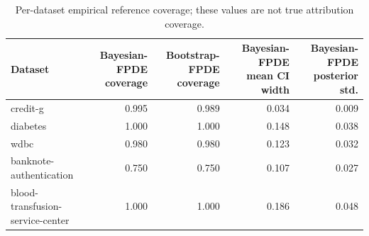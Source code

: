 \begin{table}[t]
\centering
\caption{Per-dataset empirical reference coverage; these values are not true attribution coverage.}
\label{tab:per_dataset_coverage}
\begin{tabular}{l r r r r}
        \hline
        Dataset & Bayesian-FPDE coverage & Bootstrap-FPDE coverage & Bayesian-FPDE mean CI width & Bayesian-FPDE posterior std. \\
        \hline
        credit-g & 0.995 & 0.989 & 0.034 & 0.009 \\
        diabetes & 1.000 & 1.000 & 0.148 & 0.038 \\
        wdbc & 0.980 & 0.980 & 0.123 & 0.032 \\
        banknote-authentication & 0.750 & 0.750 & 0.107 & 0.027 \\
        blood-transfusion-service-center & 1.000 & 1.000 & 0.186 & 0.048 \\
        \hline
\end{tabular}
\end{table}
